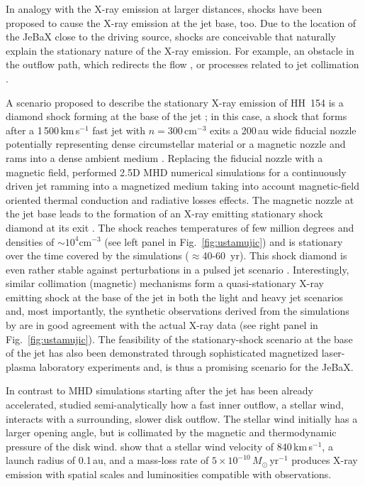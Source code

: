 In analogy with the X-ray emission at larger distances, shocks have been proposed to cause the X-ray emission at the jet base, too. Due to the location of the JeBaX close to the driving source, shocks  are conceivable that  naturally explain the stationary nature of the X-ray emission. For example, an obstacle in the outflow path, which redirects the flow \citep[either the magnetic field or the dense ambient medium, see][]{Bally_2003,Guenther_2014}, or processes related to jet collimation \citep[e.g.][]{Schneider_2011}. 

A scenario proposed to describe the stationary X-ray emission of HH~154 is a diamond shock forming at the base of the jet \cite{Bonito_2011}; in this case, a shock that forms after a 1\,500\,km\,s$^{-1}$ fast jet with $n=300\,$cm$^{-3}$ exits a 200\,au wide fiducial nozzle potentially representing dense circumstellar material or a magnetic nozzle and rams into a dense ambient medium \citep[$n=3\times10^3\,$cm$^{-3}$,][]{Bonito_2011}. 
Replacing the fiducial nozzle with a magnetic field, \citet{Ustamujic_2016} performed  2.5D MHD numerical simulations for a continuously driven jet ramming into a magnetized medium taking into account magnetic-field oriented thermal conduction  and radiative losses effects. The magnetic nozzle at the jet base leads to the formation of an X-ray emitting stationary shock diamond at its exit  \citep[see 3D reconstruction in left panel in Fig.~\ref{fig:ustamujic} and][]{Ustamujic_2016}. The shock reaches temperatures of few million degrees and densities of $\sim 10^4$cm$^{-3}$ (see left panel in Fig.~\ref{fig:ustamujic}) and is stationary over the time covered by the simulations ($\approx$40-60~yr). 
This shock diamond is even rather stable against perturbations in a pulsed jet scenario \cite{Ustamujic_2018}. Interestingly, similar collimation (magnetic) mechanisms form a quasi-stationary X-ray emitting shock at the base of the jet in both the light and heavy jet scenarios \cite{Ustamujic_2018} and, most importantly, the synthetic observations derived from the simulations by \citet{Ustamujic_2018} are in good agreement with the actual X-ray data (see right panel in Fig.~\ref{fig:ustamujic}). The feasibility of the stationary-shock scenario at the base of the jet has also been demonstrated through sophisticated magnetized laser-plasma laboratory experiments \cite{Albertazzi_2014, PhysRevLett.119.255002} and, is thus a promising scenario for the JeBaX.


In contrast to MHD simulations starting after the jet has been already accelerated,  \citet{Guenther_2014} studied semi-analytically how a fast inner outflow, a stellar wind, interacts with a surrounding, slower disk outflow. The stellar wind initially has a larger opening angle, but is collimated by the magnetic and thermodynamic pressure of the disk wind. \citet{Guenther_2014} show that a stellar wind velocity of 840\,km\,s$^{-1}$, a launch radius of 0.1\,au, and a mass-loss rate of $5\times10^{-10}\,M_\odot$\,yr$^{-1}$ produces X-ray emission with spatial scales and luminosities compatible with observations.

